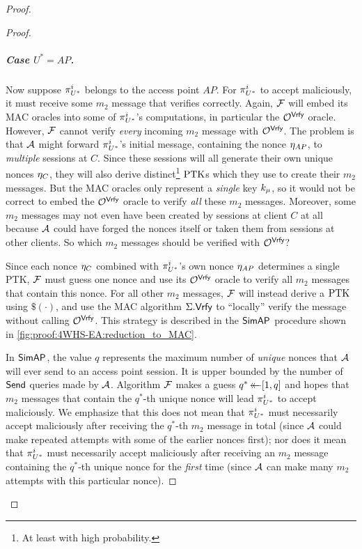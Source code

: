\begin{proof}
\begin{proof}
\subparagraph{Case \texorpdfstring{$U^* = AP$}{U* = AP}.}
Now suppose $\eatarget$ belongs to the access point $AP$.
For $\eatarget$ to accept maliciously,
it must receive some $m_2$ message that verifies correctly.
Again,
$\A[F]$ will embed its MAC oracles into some of $\eatarget$'s computations,
in particular the $\mathcal{O}^{\macvrfy}$ oracle.
However,
$\A[F]$ cannot verify \emph{every} incoming $m_2$ message with $\mathcal{O}^{\macvrfy}$.
The problem is that $\A$ might forward $\eatarget$'s initial message,
containing the nonce $\nonce_{AP}$,
to \emph{multiple} sessions at $C$.
Since these sessions will all generate their own unique nonces $\nonce_{C}$,
they will also derive distinct\footnote{At 
least with high probability.
} 
$\PTK$s which they use to create their $m_2$ messages.
But the MAC oracles only represent a \emph{single} key $\key_{\mu}$,
so it would not be correct to embed the $\mathcal{O}^{\macvrfy}$ oracle to verify \emph{all} these $m_2$ messages.
Moreover,
some $m_2$ messages may not even have been created by sessions at client $C$ at all because $\A$ could have forged the nonces itself or taken them from sessions at other clients.
So which $m_2$ messages should be verified with $\mathcal{O}^{\macvrfy}$?

Since each nonce $\nonce_{C}$ combined with $\eatarget$'s own nonce $\nonce_{AP}$ determines a single PTK,
$\A[F]$ must guess one nonce and use its $\mathcal{O}^{\macvrfy}$ oracle to verify all $m_2$ messages that contain this nonce. 
For all other $m_2$ messages,
$\A[F]$ will instead derive a $\PTK$ using $\$(\cdot)$, 
and use the MAC algorithm $\mac.\macvrfy$ to ``locally'' verify the message without calling $\mathcal{O}^{\macvrfy}$.
This strategy is described in the $\simAP$ procedure shown in \cref{fig:proof:4WHS-EA:reduction_to_MAC}.  

In $\simAP$, 
the value $q$ represents the maximum number of \emph{unique} nonces that $\A$ will ever send to an access point session.
It is upper bounded by the number of $\Send$ queries made by $\A$.
Algorithm
$\A[F]$ makes a guess $q^* \getsr [1, q]$ and hopes that $m_2$ messages that contain the $q^*$-th unique nonce will lead $\eatarget$ to accept maliciously. 
We emphasize that this does not mean that $\eatarget$ must necessarily accept maliciously after receiving  the $q^*$-th $m_2$ message in total
(since $\A$ could make repeated attempts with some of the earlier nonces first); 
nor does it mean that $\eatarget$ must necessarily accept maliciously after receiving an $m_2$ message containing the $q^*$-th unique nonce for the \emph{first} time
(since $\A$ can make many $m_2$ attempts with this particular nonce). 


\end{proof}
\end{proof}
